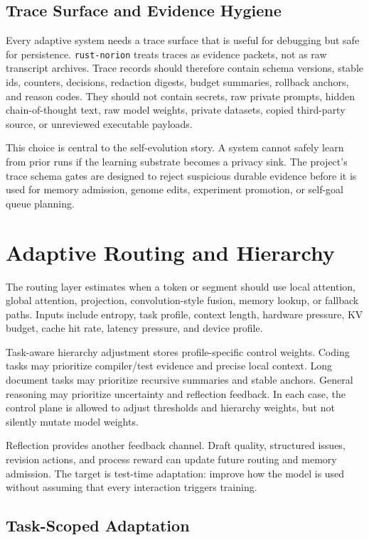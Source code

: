 \documentclass[10pt]{article}
\begin{document}
\subsection{Trace Surface and Evidence Hygiene}

Every adaptive system needs a trace surface that is useful for debugging but
safe for persistence. \texttt{rust-norion} treats traces as evidence packets,
not as raw transcript archives. Trace records should therefore contain schema
versions, stable ids, counters, decisions, redaction digests, budget summaries,
rollback anchors, and reason codes. They should not contain secrets, raw
private prompts, hidden chain-of-thought text, raw model weights, private
datasets, copied third-party source, or unreviewed executable payloads.

This choice is central to the self-evolution story. A system cannot safely
learn from prior runs if the learning substrate becomes a privacy sink. The
project's trace schema gates are designed to reject suspicious durable evidence
before it is used for memory admission, genome edits, experiment promotion, or
self-goal queue planning.

\section{Adaptive Routing and Hierarchy}

The routing layer estimates when a token or segment should use local attention,
global attention, projection, convolution-style fusion, memory lookup, or
fallback paths. Inputs include entropy, task profile, context length, hardware
pressure, KV budget, cache hit rate, latency pressure, and device profile.

Task-aware hierarchy adjustment stores profile-specific control weights. Coding
tasks may prioritize compiler/test evidence and precise local context. Long
document tasks may prioritize recursive summaries and stable anchors. General
reasoning may prioritize uncertainty and reflection feedback. In each case, the
control plane is allowed to adjust thresholds and hierarchy weights, but not
silently mutate model weights.

Reflection provides another feedback channel. Draft quality, structured issues,
revision actions, and process reward can update future routing and memory
admission. The target is test-time adaptation: improve how the model is used
without assuming that every interaction triggers training.

\subsection{Task-Scoped Adaptation}
\end{document}
